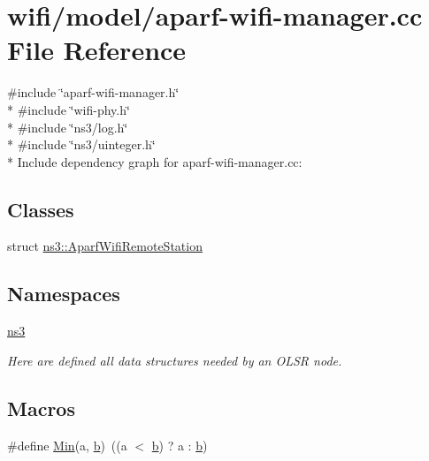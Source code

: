 \hypertarget{aparf-wifi-manager_8cc}{}\section{wifi/model/aparf-\/wifi-\/manager.cc File Reference}
\label{aparf-wifi-manager_8cc}
{\ttfamily \#include \char`\"{}aparf-\/wifi-\/manager.\+h\char`\"{}}\\*
{\ttfamily \#include \char`\"{}wifi-\/phy.\+h\char`\"{}}\\*
{\ttfamily \#include \char`\"{}ns3/log.\+h\char`\"{}}\\*
{\ttfamily \#include \char`\"{}ns3/uinteger.\+h\char`\"{}}\\*
Include dependency graph for aparf-\/wifi-\/manager.cc\+:
\subsection*{Classes}
\begin{DoxyCompactItemize}
\item 
struct \hyperlink{structns3_1_1AparfWifiRemoteStation}{ns3\+::\+Aparf\+Wifi\+Remote\+Station}
\end{DoxyCompactItemize}
\subsection*{Namespaces}
\begin{DoxyCompactItemize}
\item 
 \hyperlink{namespacens3}{ns3}
\begin{DoxyCompactList}\small\item\em Here are defined all data structures needed by an O\+L\+SR node. \end{DoxyCompactList}\end{DoxyCompactItemize}
\subsection*{Macros}
\begin{DoxyCompactItemize}
\item 
\#define \hyperlink{aparf-wifi-manager_8cc_a9e04209162ea72f9985338596262b657}{Min}(a,  \hyperlink{lte__pathloss_8m_a21ad0bd836b90d08f4cf640b4c298e7c}{b})~((a $<$ \hyperlink{lte__pathloss_8m_a21ad0bd836b90d08f4cf640b4c298e7c}{b}) ? a \+: \hyperlink{lte__pathloss_8m_a21ad0bd836b90d08f4cf640b4c298e7c}{b})
\end{DoxyCompactItemize}

